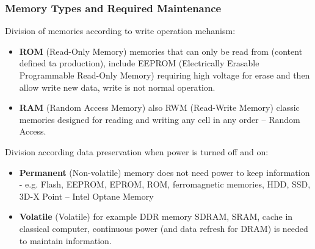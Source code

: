 \documentclass{beamer}
\begin{document}
\begin{frame}
\frametitle{Memory Types and Required Maintenance}

Division of memories according to write operation mehanism:

\begin{itemize}
\item \textbf{ROM} (Read-Only Memory) memories that can only be read from (content defined ta production), include EEPROM (Electrically Erasable Programmable Read-Only Memory) requiring high voltage for erase and then allow write new data, write is not normal operation.
\item \textbf{RAM} (Random Access Memory) also RWM (Read-Write Memory) classic memories designed for reading and writing any cell in any order -- Random Access.
\end{itemize}

Division according data preservation when power is turned off and on:
\begin{itemize}
\item \textbf{Permanent} (Non-volatile) memory does not need power to keep information - e.g. Flash, EEPROM, EPROM, ROM, ferromagnetic memories, HDD, SSD, 3D-X Point -- Intel Optane Memory
\item \textbf{Volatile} (Volatile) for example DDR memory SDRAM, SRAM, cache in classical computer, continuous power (and data refresh for DRAM) is needed to maintain information.
\end{itemize}

\end{frame}
\end{document}
